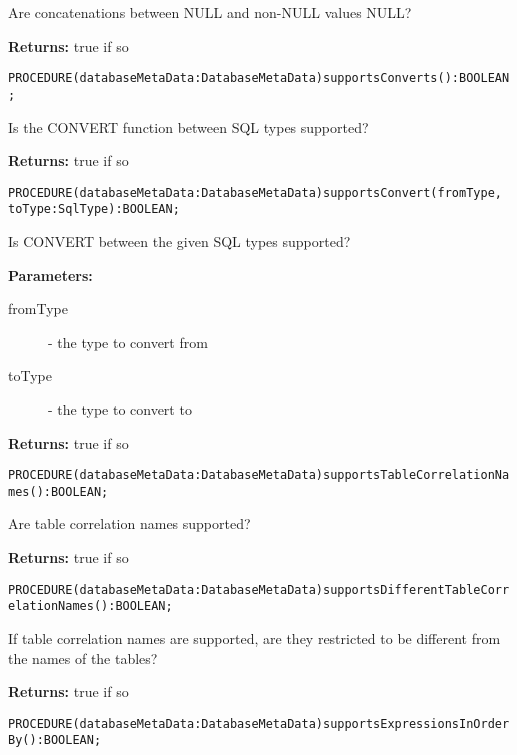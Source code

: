 Are concatenations between NULL and non-NULL values NULL? 


{\bf Returns: } 
true if so 




\verb'PROCEDURE(databaseMetaData:DatabaseMetaData)supportsConverts():BOOLEAN;'






Is the CONVERT function between SQL types supported? 


{\bf Returns: } 
true if so 




\verb'PROCEDURE(databaseMetaData:DatabaseMetaData)supportsConvert(fromType, toType:SqlType):BOOLEAN;'






Is CONVERT between the given SQL types supported? 


{\bf Parameters: }
\begin{description}
\item[fromType] - the type to convert from 
\item[toType] - the type to convert to 
\end{description}

{\bf Returns: } 
true if so 




\verb'PROCEDURE(databaseMetaData:DatabaseMetaData)supportsTableCorrelationNames():BOOLEAN;'






Are table correlation names supported?


{\bf Returns: } 
true if so 




\verb'PROCEDURE(databaseMetaData:DatabaseMetaData)supportsDifferentTableCorrelationNames():BOOLEAN;'






If table correlation names are supported, are they restricted to be different from the names of the tables? 


{\bf Returns: } 
true if so 




\verb'PROCEDURE(databaseMetaData:DatabaseMetaData)supportsExpressionsInOrderBy():BOOLEAN;'






